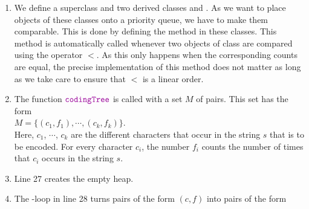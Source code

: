 \begin{enumerate}
\begin{enumerate}[(a)]
            The function call $\mytt{heappush}(H, x)$ does not return a value.  Rather, the heap $H$ is
            modified in place.
      \item Given a heap $H$, the function call
            \\[0.2cm]
            \hspace*{1.3cm}
            $\mytt{heapq.heappop}(H)$
            \\[0.2cm]
            returns the object from $H$ that has the highest priority and removes this object from the heap
            $H$.
      \item As heaps are represented as lists, the empty heap is represented by the empty list.
      \item If  is a list representing a heap, then the object with the highest priority is at the
            beginning of this list.  Therefore  is the object with the highest priority in .
      \end{enumerate}
\item We define a superclass  and two derived classes  and .
      As we want to place objects of these classes onto a priority queue, we have to make them comparable.
      This is done by defining the method  in these classes.  This method is automatically 
      called whenever two objects of class  are compared using the operator $<$.
      As this only happens when the corresponding counts are equal, the precise implementation of this
      method does not matter as long as we take care to ensure that $<$ is a linear order.
\item The function $\mytt{codingTree}$ is called with a set  $M$ of pairs.  This set has the form
      \\[0.2cm]
      \hspace*{1.3cm}
      $M = \bigl\{ (c_1, f_1), \cdots, (c_k, f_k) \bigr\}$.
      \\[0.2cm]
      Here, $c_1$, $\cdots$, $c_k$ are the different characters that occur in the string $s$ that is to be encoded. 
      For every character $c_i$, the number $f_i$ counts the number of times that $c_i$ occurs in the string
      $s$.
\item Line 27 creates the empty heap.
\item The -loop in line 28 turns pairs of the form $(c, f)$ into pairs of the form
      \\[0.2cm]
      \hspace*{1.3cm}

\end{enumerate}
